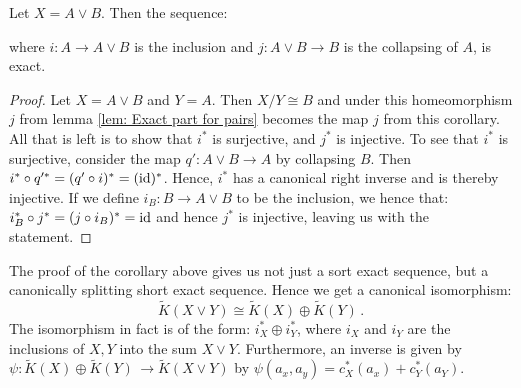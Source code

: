 \begin{corollary}
	Let $X=A\vee B$. Then the sequence:
	\begin{center}
	\end{center}
	where $i:A\to A\vee B$ is the inclusion and $j: A\vee B\to B$ is the collapsing of $A$, is exact.
\end{corollary}
\begin{proof}
	Let $X=A\vee B$ and $Y=A$. Then $X\slash Y \cong B$ and under this homeomorphism $j$ from lemma \ref{lem: Exact part for pairs} becomes the map $j$ from this corollary. All that is left is to show that $i^*$ is surjective, and $j^*$ is injective. 
	To see that $i^*$ is surjective, consider the map $q':A\vee B\to A$ by collapsing $B$. Then $i^*\circ q'^*=(q'\circ i)^*=(\operatorname{\mathrm{id}})^*$. Hence, $i^*$ has a canonical right inverse and is thereby injective.  If we define $i_B:B\to A\vee B$ to be the inclusion, we hence that: $i_B^*\circ j^*=(j\circ i_B)^*=\operatorname{\mathrm{id}}$ and hence $j^*$ is injective, leaving us with the statement.
\end{proof}
\begin{theorem}[Additivity]
	The proof of the corollary above gives us not just a sort exact sequence, but a canonically splitting short exact sequence. Hence we get a canonical isomorphism:
	\begin{equation*}
		\tilde{K}(X\vee Y)\cong \tilde{K}(X)\oplus \tilde{K}(Y)\, .
	\end{equation*}
	The isomorphism in fact is of the form: $i_X^*\oplus i_Y^*$, where $i_X$ and $i_Y$ are the inclusions of $X,Y$ into the sum $X\vee Y$. Furthermore, an inverse is given by $\psi: \tilde{K}(X)\oplus \tilde{K}(Y)\,  \to \tilde{K}(X\vee Y)$ by $\psi(a_x,a_y)=c_X^*(a_x)+c_Y^*(a_Y)$.
\end{theorem}
